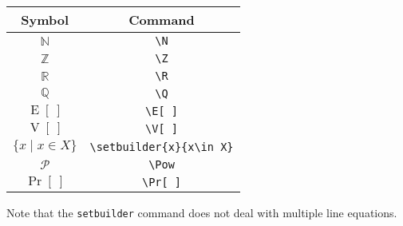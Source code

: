   \begin{center}
    \begin{tabular}{|c|c|}
      \hline
      \textbf{Symbol} & \textbf{Command} \\\hline
      $\mathbb{N}$ & \texttt{\textbackslash N} \\\hline
      $\mathbb{Z}$ & \texttt{\textbackslash Z} \\\hline
      $\mathbb{R}$ & \texttt{\textbackslash R} \\\hline
      $\mathbb{Q}$ & \texttt{\textbackslash Q} \\\hline
      $\operatorname{E}[\ ]$ & \texttt{\textbackslash E[\ ]} \\\hline
      $\operatorname{V}[\ ]$ & \texttt{\textbackslash V[\ ]} \\\hline
      $\{x\;|\;x\in X\}$ & \texttt{\textbackslash setbuilder\{x\}\{x\textbackslash in\ X\}} \\\hline
      $\mathcal{P}$ & \texttt{\textbackslash Pow} \\\hline
      $\Pr[\ ]$ & \texttt{\textbackslash Pr[\ ]} \\\hline
    \end{tabular}
  \end{center}
  
  Note that the \texttt{setbuilder} command does not deal with multiple line equations.
  
  
  
  
  